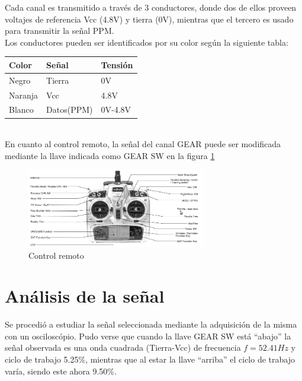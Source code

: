 \documentclass[main]{subfiles}
\begin{document}
Cada canal es transmitido a través de 3 conductores, donde dos de ellos proveen voltajes de referencia Vcc (4.8V) y tierra (0V), mientras que el tercero es usado para transmitir la señal PPM.\\


Los conductores pueden ser identificados por su color según la siguiente tabla:\\

\begin{tabular}{|l|l|l|}
\hline
Color 		& Señal			&Tensión	\\
\hline
Negro		& Tierra		& 0V		\\
\hline
Naranja 	& Vcc			& 4.8V 		\\
\hline
Blanco 		& Datos(PPM) 	& 0V-4.8V 	\\
\hline
\end{tabular}
\\

En cuanto al control remoto, la señal del canal GEAR puede ser modificada mediante la llave indicada como GEAR SW en la figura \ref{fig:control}

\begin{figure}[H]
\begin{center}
\includegraphics[width=0.7\textwidth]{./pics_switcheo/control.png}
\caption{Control remoto}
\label{fig:control}
\end{center}
\end{figure}

\section{Análisis de la señal}

Se procedió a estudiar la señal seleccionada mediante la adquisición de la misma con un osciloscópio. Pudo verse que cuando la llave GEAR SW está ``abajo'' la señal observada es una onda cuadrada (Tierra-Vcc) de frecuencia $f=52.41Hz$ y ciclo de trabajo 5.25\%, mientras que al estar la llave ``arriba'' el ciclo de trabajo varía, siendo este ahora 9.50\%.\\
\end{document}
